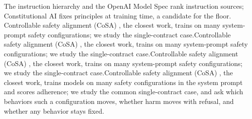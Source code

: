 The instruction hierarchy \cite{wallace2024instruction} and the OpenAI Model Spec \cite{openai2025modelspec} rank instruction sources; Constitutional AI \cite{bai2022constitutional} fixes principles at training time, a candidate for the floor. \ifvenueLoyal Controllable safety alignment (CoSA) \cite{zhang2025cosa}, the closest work, trains on many system-prompt safety configurations; we study the single-contract case.\else\ifvenueRobust Controllable safety alignment (CoSA) \cite{zhang2025cosa}, the closest work, trains on many system-prompt safety configurations; we study the single-contract case.\else\ifvenueBench Controllable safety alignment (CoSA) \cite{zhang2025cosa}, the closest work, trains on many system-prompt safety configurations; we study the single-contract case.\else Controllable safety alignment (CoSA) \cite{zhang2025cosa}, the closest work, trains models on many safety configurations in the system prompt and scores adherence; we study the common single-contract case, and ask which behaviors such a configuration moves, whether harm moves with refusal, and whether any behavior stays fixed.\fi\fi\fi  %
